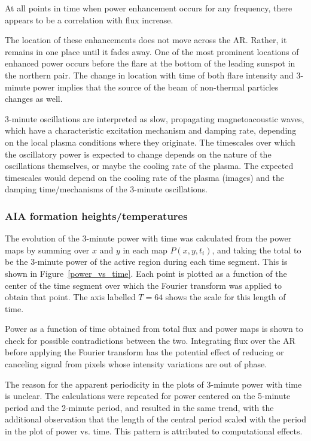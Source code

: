 At all points in time when power enhancement occurs for any frequency,
there appears to be a correlation with flux increase.


The location of these enhancements does not move across the AR.
Rather, it remains in one place until it fades away.
One of the most prominent locations of enhanced power occurs before
the flare at the bottom of the leading sunspot in the northern pair.
The change in location with time of both flare intensity and 3-minute power
implies that the source of the beam of non-thermal particles changes as well.

3-minute oscillations are interpreted as slow, propagating magnetoacoustic waves,
which have a characteristic excitation mechanism and damping rate,
depending on the local plasma conditions where they originate.
The timescales over which the oscillatory power is expected to change
depends on the nature of the oscillations themselves,
or maybe the cooling rate of the plasma.
The expected timescales would depend on the cooling rate of the plasma
(images) and the damping time/mechanisms of the 3-minute oscillations.

\subsubsection{AIA formation heights/temperatures}

The evolution of the 3-minute power with time
was calculated from the power maps
by summing over $x$ and $y$ in each map $P(x,y,t_{i})$, and taking the total
to be the 3-minute power of the active region during each time segment.
This is shown in Figure~\ref{power_vs_time}.
Each point is plotted as a function of the center of the time segment
over which the Fourier transform was applied to obtain that point.
The axis labelled $T=64$ shows the scale for this length of time.

Power as a function of time obtained from total flux and power maps
is shown to check for possible contradictions between the two.
Integrating flux over the AR
before applying the Fourier transform
has the potential effect of reducing or canceling signal from
pixels whose intensity variations are out of phase.

The reason for the apparent periodicity in the plots of 3-minute power with time
is unclear.
The calculations were repeated for power centered on the
5-minute period and the 2-minute period,
and resulted in the same trend,
with the additional observation
that the length of the central period
scaled with the period in the plot of power vs. time.
This pattern is attributed to computational effects.



